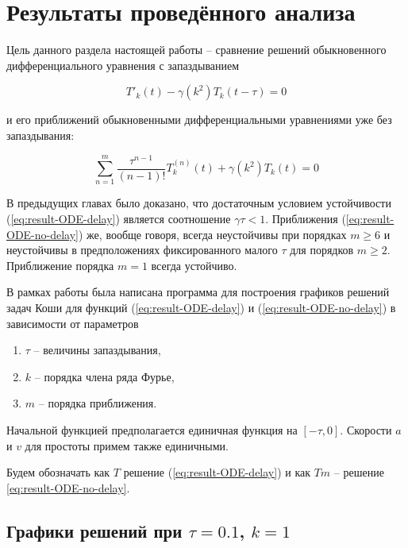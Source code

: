 \section{Результаты проведённого анализа}

Цель данного раздела настоящей работы \--- сравнение решений обыкновенного дифференциального уравнения с запаздыванием

\begin{equation}\label{eq:result-ODE-delay}
{T'}_{k}(t) - \gamma(k^2) T_k(t-\tau)=0
\end{equation}

и его приближений обыкновенными дифференциальными уравнениями уже без запаздывания:

\begin{equation}\label{eq:result-ODE-no-delay}
\sum\limits_{n=1}^{m} \dfrac{\tau^{n-1}}{(n-1)!} T_k^{(n)} (t) + \gamma(k^2) T_k (t) = 0
\end{equation}

В предыдущих главах было доказано, что достаточным условием устойчивости (\ref{eq:result-ODE-delay}) является соотношение $\gamma \tau <1$. Приближения (\ref{eq:result-ODE-no-delay}) же, вообще говоря, всегда неустойчивы при порядках $m \geq 6$ и неустойчивы в предположениях фиксированного малого $\tau$ для порядков $m \geq 2$. Приближение порядка $m=1$ всегда устойчиво.

В рамках работы была написана программа для построения графиков решений задач Коши для функций (\ref{eq:result-ODE-delay}) и (\ref{eq:result-ODE-no-delay}) в зависимости от параметров 

\begin{enumerate}
\item $\tau$ \--- величины запаздывания,
\item $k$ \--- порядка члена ряда Фурье,
\item $m$ \--- порядка приближения.
\end{enumerate}

Начальной функцией предполагается единичная функция на $[-\tau,0]$. Скорости $a$ и $v$ для простоты примем также единичными.

Будем обозначать как $T$ \- решение (\ref{eq:result-ODE-delay}) и как $Tm$ \--- решение \ref{eq:result-ODE-no-delay}.

\newpage

\subsection{Графики решений при $\tau=0.1$, $k=1$}

